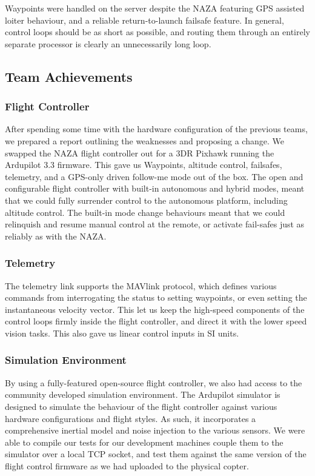 \documentclass[a4paper, 11pt, titlepage]{article}
\begin{document}
      Waypoints were handled on the server despite the NAZA featuring GPS assisted loiter behaviour, and a reliable return-to-launch failsafe feature.  In general, control loops should be as short as possible, and routing them through an entirely separate processor is clearly an unnecessarily long loop.

  \subsection{Team Achievements}
    \subsubsection{Flight Controller}
    After spending some time with the hardware configuration of the previous teams, we prepared a report outlining the weaknesses and proposing a change.
    We swapped the NAZA flight controller out for a 3DR Pixhawk running the Ardupilot 3.3 firmware.  This gave us Waypoints, altitude control, failsafes, telemetry, and a GPS-only driven follow-me mode out of the box.
    The open and configurable flight controller with built-in autonomous and hybrid modes, meant that we could fully surrender control to the autonomous platform, including altitude control.  The built-in mode change behaviours meant that we could relinquish and resume manual control at the remote, or activate fail-safes just as reliably as with the NAZA.
    
    \subsubsection{Telemetry}
    The telemetry link supports the MAVlink protocol, which defines various commands from interrogating the status to setting waypoints, or even setting the instantaneous velocity vector.  This let us keep the high-speed components of the control loops firmly inside the flight controller, and direct it with the lower speed vision tasks.  This also gave us linear control inputs in SI units.

    \subsubsection{Simulation Environment}
    By using a fully-featured open-source flight controller, we also had access to the community developed simulation environment.  The Ardupilot simulator is designed to simulate the behaviour of the flight controller against various hardware configurations and flight styles.  As such, it incorporates a comprehensive inertial model and noise injection to the various sensors.  We were able to compile our tests for our development machines couple them to the simulator over a local TCP socket, and test them against the same version of the flight control firmware as we had uploaded to the physical copter.
\end{document}

